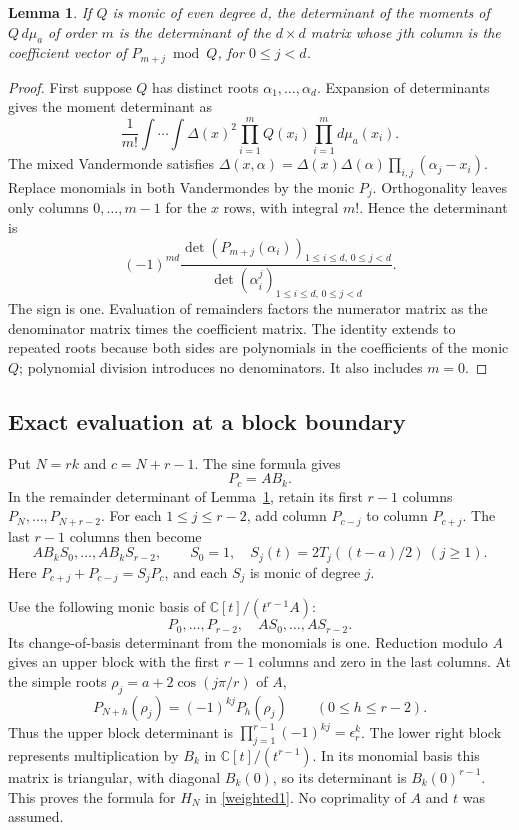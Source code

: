 \documentclass[10pt]{article}
\newtheorem{lemma}{Lemma}
\begin{document}
\begin{lemma}\label{remainder}
If $Q$ is monic of even degree $d$, the determinant of the moments
of $Q\,d\mu_a$ of order $m$ is the determinant of the $d\times d$
matrix whose $j$th column is the coefficient vector of
$P_{m+j}\bmod Q$, for $0\le j<d$.
\end{lemma}
\begin{proof}
First suppose $Q$ has distinct roots $\alpha_1,\ldots,\alpha_d$.
Expansion of determinants gives the moment determinant as
\[
 \frac1{m!}\int\cdots\int\Delta(x)^2\prod_{i=1}^m Q(x_i)
 \prod_{i=1}^m d\mu_a(x_i).
\]
The mixed Vandermonde satisfies
$\Delta(x,\alpha)=\Delta(x)\Delta(\alpha)\prod_{i,j}(\alpha_j-x_i)$.
Replace monomials in both Vandermondes by the monic $P_j$.
Orthogonality leaves only columns $0,\ldots,m-1$ for the $x$ rows,
with integral $m!$. Hence the determinant is
\[
 (-1)^{md}\frac{\det(P_{m+j}(\alpha_i))_{1\le i\le d,\,0\le j<d}}
 {\det(\alpha_i^j)_{1\le i\le d,\,0\le j<d}}.
\]
The sign is one. Evaluation of remainders factors the numerator
matrix as the denominator matrix times the coefficient matrix.
The identity extends to repeated roots because both sides are
polynomials in the coefficients of the monic $Q$; polynomial
division introduces no denominators. It also includes $m=0$.
\end{proof}

\subsection*{Exact evaluation at a block boundary}
Put $N=rk$ and $c=N+r-1$. The sine formula gives
\begin{equation}\label{composition}
 P_c=A B_k.
\end{equation}
In the remainder determinant of Lemma~\ref{remainder}, retain its
first $r-1$ columns $P_N,\ldots,P_{N+r-2}$. For each
$1\le j\le r-2$, add column $P_{c-j}$ to column $P_{c+j}$.
The last $r-1$ columns then become
\[
 A B_k S_0,\ldots,A B_k S_{r-2},\qquad
 S_0=1,\quad S_j(t)=2T_j((t-a)/2)\ (j\ge1).
\]
Here $P_{c+j}+P_{c-j}=S_jP_c$, and each $S_j$ is monic of degree $j$.

Use the following monic basis of $\mathbb C[t]/(t^{r-1}A)$:
\[
 P_0,\ldots,P_{r-2},\quad A S_0,\ldots,A S_{r-2}.
\]
Its change-of-basis determinant from the monomials is one. Reduction
modulo $A$ gives an upper block with the first $r-1$ columns and zero
in the last columns. At the simple roots
$\rho_j=a+2\cos(j\pi/r)$ of $A$,
\[
 P_{N+h}(\rho_j)=(-1)^{kj}P_h(\rho_j)\qquad(0\le h\le r-2).
\]
Thus the upper block determinant is
$\prod_{j=1}^{r-1}(-1)^{kj}=\epsilon_r^k$.
The lower right block represents multiplication by $B_k$ in
$\mathbb C[t]/(t^{r-1})$. In its monomial basis this matrix is
triangular, with diagonal $B_k(0)$, so its determinant is
$B_k(0)^{r-1}$. This proves the formula for $H_N$ in
\eqref{weighted1}. No coprimality of $A$ and $t$ was assumed.
\end{document}
